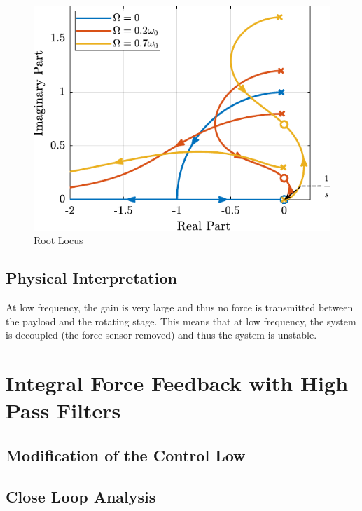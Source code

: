 \documentclass{ISMA_USD2020}
\begin{document}
\begin{figure}[htbp]
\centering
\includegraphics[scale=1]{figs/root_locus_pure_iff.pdf}
\caption{\label{fig:root_locus_pure_iff}Root Locus}
\end{figure}

\subsection{Physical Interpretation}
\label{sec:org159680e}

At low frequency, the gain is very large and thus no force is transmitted between the payload and the rotating stage.
This means that at low frequency, the system is decoupled (the force sensor removed) and thus the system is unstable.

\section{Integral Force Feedback with High Pass Filters}
\label{sec:org694707d}
\subsection{Modification of the Control Low}
\label{sec:org931fb10}

\subsection{Close Loop Analysis}
\label{sec:org9de0aa7}
\end{document}
